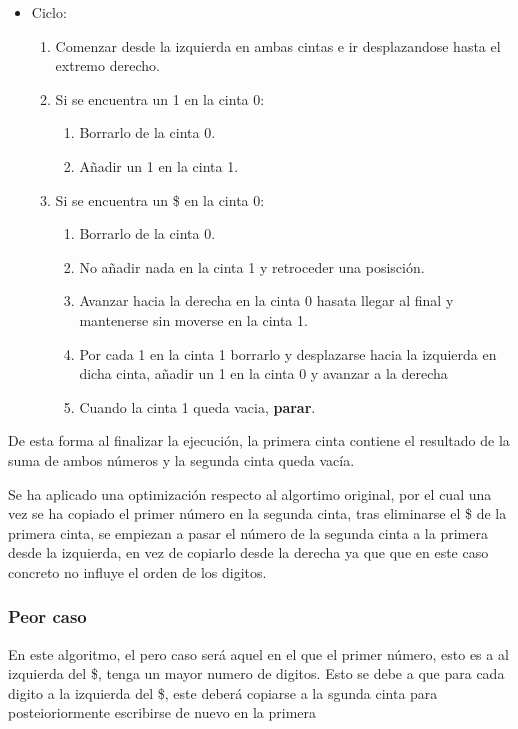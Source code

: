 \begin{itemize}
    \item Ciclo:
    \begin{enumerate}[1.]
        \item Comenzar desde la izquierda en ambas cintas e ir desplazandose hasta el extremo derecho.
        \item Si se encuentra un 1 en la cinta 0:
        \begin{enumerate}[1.]
            \item Borrarlo de la cinta 0.
            \item Añadir un 1 en la cinta 1.
        \end{enumerate}
        \item Si se encuentra un \$ en la cinta 0:
        \begin{enumerate}[1.]
            \item Borrarlo de la cinta 0.
            \item No añadir nada en la cinta 1 y retroceder una posisción.
            \item Avanzar hacia la derecha en la cinta 0 hasata llegar al final y mantenerse sin moverse en la cinta 1.
            \item Por cada 1 en la cinta 1 borrarlo y desplazarse hacia la izquierda en dicha cinta, añadir un 1 en la cinta 0 y avanzar a la derecha
            \item Cuando la cinta 1 queda vacia, \textbf{parar}.
        \end{enumerate}
    \end{enumerate}
\end{itemize}
De esta forma al finalizar la ejecución, la primera cinta contiene el resultado de la suma de ambos números y la segunda cinta queda vacía.\medskip


Se ha aplicado una optimización respecto al algortimo original, por el cual una vez se ha copiado el primer número en la segunda cinta, tras eliminarse el \$ de la primera cinta, se empiezan a pasar el número de la segunda cinta a la primera desde la izquierda, en vez de copiarlo desde la derecha ya que que en este caso concreto no influye el orden de los digitos.\medskip



\subsubsection*{Peor caso}
En este algoritmo, el pero caso será aquel en el que el primer número, esto es a al izquierda del \$, tenga un mayor numero de digitos. Esto se debe a que para cada digito a la izquierda del \$, este deberá copiarse a la sgunda cinta  para posteioriormente escribirse de nuevo en la primera


